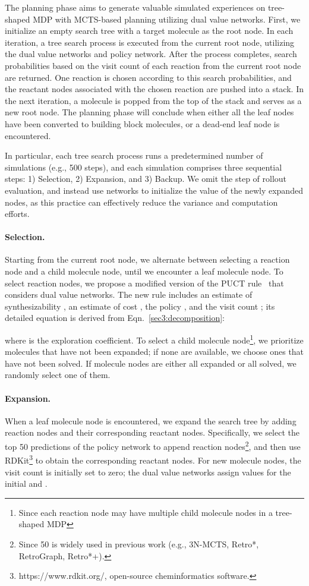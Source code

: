 \documentclass[nohyperref]{article}
\theoremstyle{plain}
\theoremstyle{definition}
\theoremstyle{remark}
\begin{document}
The planning phase aims to generate valuable simulated experiences on tree-shaped MDP with MCTS-based planning utilizing dual value networks. 
First, we initialize an empty search tree with a target molecule as the root node.
In each iteration, a tree search process is executed from the current root node, utilizing the dual value networks and policy network. 
After the process completes, search probabilities based on the visit count of each reaction from the current root node are returned.
One reaction is chosen according 
to this search probabilities,
and the reactant nodes associated with the chosen reaction are pushed into a stack. 
In the next iteration, a molecule is popped from the top of the stack and serves as a new root node. 
The planning phase will conclude when either all the leaf nodes have been converted to building block molecules, or a dead-end leaf node is encountered.



In particular, each tree search process runs a predetermined number of simulations (e.g., 500 steps), and each simulation comprises three sequential steps: 1) Selection, 2) Expansion, and 3) Backup. We omit the step of rollout evaluation, and instead use networks to initialize the value of the newly expanded nodes, as this practice can effectively reduce the variance and computation efforts.

\paragraph{Selection.}
Starting from the current root node, we alternate between selecting a reaction node and a child molecule node, until we encounter a leaf molecule node.
To select reaction nodes,
we propose a modified version of the PUCT rule~\cite{rosin2011multi} that considers dual value networks.
The new rule includes an estimate of synthesizability , an estimate of cost , the policy , and the visit count ;
its detailed equation 
is derived from Eqn.~\ref{sec3:decomposition}:

where  is the exploration coefficient. 
To select a child molecule node\footnote{Since each reaction node may have multiple child molecule nodes in a tree-shaped MDP},
we prioritize molecules that have not been expanded;
if none are available, we choose ones that have not been solved. 
If molecule nodes are either all expanded or all solved, we randomly select one of them.


\paragraph{Expansion.}
When a leaf molecule node is encountered, we expand the search tree by adding reaction nodes and their corresponding reactant nodes. 
Specifically, we select the top 50 predictions of the policy network to append reaction nodes\footnote{Since 50 is widely used in previous work (e.g., 3N-MCTS, Retro*, RetroGraph, Retro*+). 
}, and then use RDKit\footnote{https://www.rdkit.org/, open-source cheminformatics software.} to obtain the corresponding reactant nodes. 
For new molecule nodes, the visit count is initially set to zero; the dual value networks assign values for the initial  and . 
\end{document}
